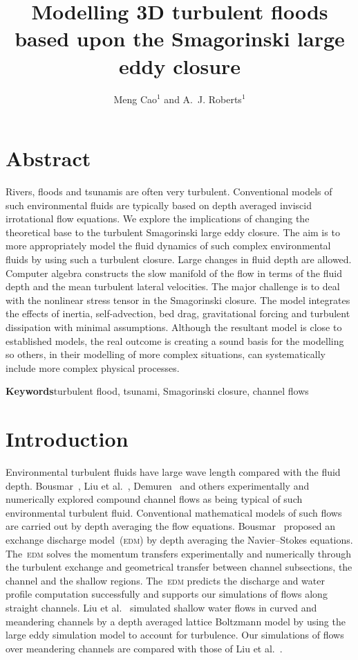 \documentclass[twocolumn]{afmc_art}
\title{Modelling 3D turbulent floods based upon the Smagorinski large eddy closure}
\author{Meng Cao$^1$ and A.~J. Roberts$^1$}
\affiliation{$^1$School of Mathematical Sciences\\
                University of Adelaide, South Australia 5005, Australia\\[5pt]
            }
\begin{document}
    
\maketitle

\section{Abstract}
Rivers, floods and tsunamis are often very turbulent.
Conventional models of such environmental fluids are typically based on depth averaged inviscid irrotational flow equations.
We explore the implications of changing the theoretical base to the turbulent Smagorinski large eddy closure.
The aim is to more appropriately model the fluid dynamics of such complex environmental fluids by using such a turbulent closure.
Large changes in fluid depth are allowed.
Computer algebra constructs the slow manifold of the flow in terms of the fluid depth and the mean turbulent lateral velocities.
The major challenge is to deal with the nonlinear stress tensor in the Smagorinski closure.
The model integrates the effects of inertia, self-advection, bed drag, gravitational forcing and turbulent dissipation with minimal assumptions.
Although the resultant model is close to established models, the real outcome is creating a sound basis for the modelling so others, in their modelling of more complex situations, can systematically include more complex physical processes.

\textbf{Keywords}\quad turbulent flood, tsunami, Smagorinski closure, channel flows

\section{Introduction}

Environmental turbulent fluids have large wave length compared with the fluid depth.
Bousmar~\cite{Bousmar2002}, Liu et al.~\cite{Liu2009}, Demuren~\cite{Demuren1993} and others experimentally and numerically explored compound channel flows as being typical of such environmental turbulent fluid.
Conventional mathematical models of such flows are carried out by depth averaging the flow equations. 
Bousmar~\cite{Bousmar2002} proposed an exchange discharge model~(\textsc{edm}) by depth averaging the Navier--Stokes equations.
The~\textsc{edm} solves the momentum transfers experimentally and numerically through the turbulent exchange and geometrical transfer between channel subsections, the channel and the shallow regions.
The~\textsc{edm} predicts the discharge and water profile computation successfully and supports our simulations of flows along straight channels. 
Liu et al.~\cite{Liu2009} simulated shallow water flows in curved and meandering channels by a depth averaged lattice Boltzmann model by using the large eddy simulation model to account for turbulence.
Our simulations of flows over meandering channels are compared with those of Liu et al.~\cite{Liu2009}. 
\end{document}
